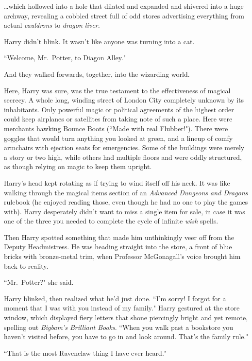 {\ldots}which hollowed into a hole that dilated and expanded and shivered into a huge archway, revealing a cobbled street full of odd stores advertising everything from actual \emph{cauldrons} to \emph{dragon liver.}

Harry didn't blink. It wasn't like anyone was turning into a cat.

``Welcome, Mr.~Potter, to Diagon Alley."

And they walked forwards, together, into the wizarding world.

Here, Harry was sure, was the true testament to the effectiveness of magical secrecy. A whole long, winding street of London City completely unknown by its inhabitants. Only powerful magic or political agreements of the highest order could keep airplanes or satellites from taking note of such a place. Here were merchants hawking Bounce Boots (``Made with real Flubber!"). There were goggles that would turn anything you looked at green, and a lineup of comfy armchairs with ejection seats for emergencies. Some of the buildings were merely a story or two high, while others had multiple floors and were oddly structured, as though relying on magic to keep them upright.

Harry's head kept rotating as if trying to wind itself off his neck. It was like walking through the magical items section of an \emph{Advanced Dungeons and Dragons} rulebook (he enjoyed reading those, even though he had no one to play the games with). Harry desperately didn't want to miss a single item for sale, in case it was one of the three you needed to complete the cycle of infinite \emph{wish} spells.

Then Harry spotted something that made him unthinkingly veer off from the Deputy Headmistress. He was heading straight into the store, a front of blue bricks with bronze-metal trim, when Professor McGonagall's voice brought him back to reality.

``Mr.~Potter?" she said.

Harry blinked, then realized what he'd just done. ``I'm sorry! I forgot for a moment that I was with you instead of my family." Harry gestured at the store window, which displayed fiery letters that shone piercingly bright and yet remote, spelling out \emph{Bigbam's Brilliant Books}. ``When you walk past a bookstore you haven't visited before, you have to go in and look around. That's the family rule."

``That is the most Ravenclaw thing I have ever heard."

